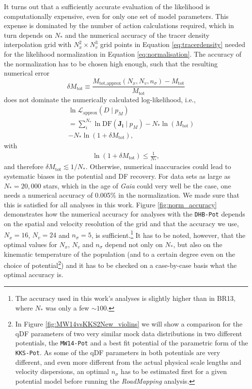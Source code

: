 \documentclass[iop,revtex4,numberedappendix,appendixfloats]{emulateapj}
\newcommand{\vect}[1]{\boldsymbol{#1}}
\newcommand{\pmodel}{\ensuremath{p_M}}
\newcommand{\RM}{{\sl RoadMapping}}
\begin{document}
It turns out that a sufficiently accurate evaluation of the likelihood is computationally expensive, even for only one set of model parameters. This expense is dominated by the number of action calculations required, which in turn depends on $N_*$ and the numerical accuracy of the tracer density interpolation grid with $N_x^2 \times N_v^3$ grid points in Equation \eqref{eq:tracerdensity} needed for the likelihood normalization in Equation \eqref{eq:normalisation}. The accuracy of the normalization has to be chosen high enough, such that the resulting numerical error 
\begin{equation}
\delta M_\text{tot} \equiv \frac{M_\text{tot,approx}(N_x,N_v,n_\sigma) - M_\text{tot} }{M_\text{tot}}\label{eq:relerrlikelihood}
\end{equation}
does not dominate the numerically calculated log-likelihood, i.e.,
\begin{eqnarray}
& & \ln \mathscr{L}_\text{approx}(D \mid \pmodel) \nonumber\\
&& = \sum_i^{N_*} \ln \text{DF}(\vect{J_i} \mid \pmodel) - N_* \ln(M_\text{tot})\nonumber\\
&& - N_* \ln (1 + \delta M_\text{tot}),\label{eq:loglikelihood_relerr}
\end{eqnarray}
with
\begin{eqnarray}
\ln (1 + \delta M_\text{tot}) \leq \frac{1}{N_{*}},\label{eq:accuracycondition}
\end{eqnarray}
and therefore $\delta M_\text{tot} \lesssim 1/N_*$. Otherwise, numerical inaccuracies could lead to systematic biases in the potential and DF recovery. For data sets as large as $N_* = 20,000$ stars, which in the age of \emph{Gaia} could very well be the case, one needs a numerical accuracy of 0.005\% in the normalization. We made sure that this is satisfied for all analyses in this work. Figure \ref{fig:norm_accuracy} demonstrates how the numerical accuracy for analyses with the \texttt{DHB-Pot} depends on the spatial and velocity resolution of the grid and that the accuracy we use, $N_x=16$, $N_v=24$ and $n_\sigma=5$, is sufficient.\footnote{The accuracy used in this work's analyses is slightly higher than in BR13, where $N_*$ was only a few $\sim 100$.} It has to be noted, however, that the optimal values for $N_x$, $N_v$ and $n_\sigma$ depend not only on $N_*$, but also on the kinematic temperature of the population (and to a certain degree even on the choice of potential\footnote{In Figure \ref{fig:MW14vsKKS2New_violins} we will show a comparison for the qDF parameters of two very similar mock data distributions in two different potentials, the \texttt{MW14-Pot} and a best fit potential of the parametric form of the \texttt{KKS-Pot}. As some of the qDF parameters in both potentials are very different, and even more different from the actual physical scale lengths and velocity dispersions, an optimal $n_\sigma$ has to be estimated first for a given potential model before running the \RM{} analysis.}) and it has to be checked on a case-by-case basis what the optimal accuracy is. 
\end{document}
